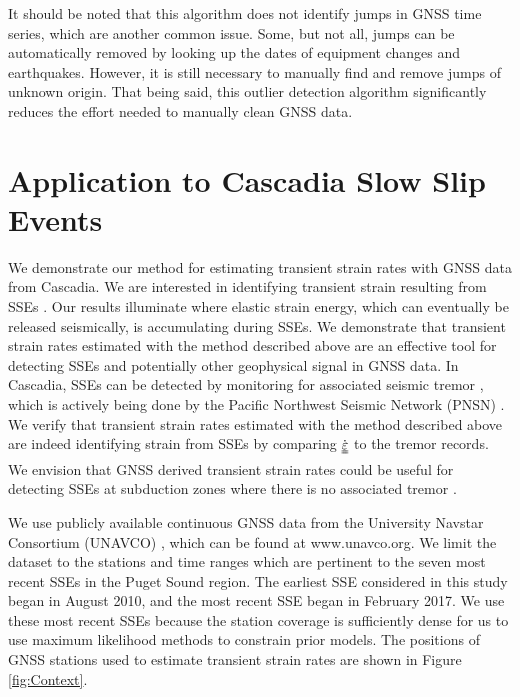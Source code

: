 \documentclass[10pt,letter]{article}
\newcommand*{\du}[1]{\uuline{#1}}
\begin{document}
It should be noted that this algorithm does not identify jumps in GNSS time series, which are another common issue. Some, but not all, jumps can be automatically removed by looking up the dates of equipment changes and earthquakes. However, it is still necessary to manually find and remove jumps of unknown origin. That being said, this outlier detection algorithm significantly reduces the effort needed to manually clean GNSS data.       

\section{Application to Cascadia Slow Slip Events}\label{sec:Cascadia}
We demonstrate our method for estimating transient strain rates with GNSS data from Cascadia. We are interested in identifying transient strain resulting from SSEs \citep[e.g.,][]{Dragert2001}. Our results illuminate where elastic strain energy, which can eventually be released seismically, is accumulating during SSEs. We demonstrate that transient strain rates estimated with the method described above are an effective tool for detecting SSEs and potentially other geophysical signal in GNSS data.  In Cascadia, SSEs can be detected by monitoring for associated seismic tremor \citep{Rogers2003}, which is actively being done by the Pacific Northwest Seismic Network (PNSN) \citep{Wech2010}. We verify that transient strain rates estimated with the method described above are indeed identifying strain from SSEs by comparing $\dot{\du{\varepsilon}}$ to the tremor records.  We envision that GNSS derived transient strain rates could be useful for detecting SSEs at subduction zones where there is no associated tremor \citep{Schwartz2007}.

We use publicly available continuous GNSS data from the University Navstar Consortium (UNAVCO) \citep{Herring2016}, which can be found at www.unavco.org. We limit the dataset to the stations and time ranges which are pertinent to the seven most recent SSEs in the Puget Sound region. The earliest SSE considered in this study began in August 2010, and the most recent SSE began in February 2017. We use these most recent SSEs because the station coverage is sufficiently dense for us to use maximum likelihood methods to constrain prior models.  The positions of GNSS stations used to estimate transient strain rates are shown in Figure \ref{fig:Context}.  
\end{document}
